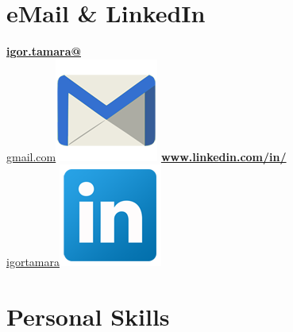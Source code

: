 \begin{aside}
    \section{eMail \& LinkedIn}
    \href{mailto:igor.tamara@gmail.com}{\small{\textbf{igor.tamara@}\\gmail.com}\includegraphics[scale=0.07]{img/email2.png}}
    \href{http:\\https://www.linkedin.com/in/igortamara/}{\textbf{www.linkedin.com/in/}\small{\\igortamara}\includegraphics[scale=0.07]{img/Linkedin.png}}
  ~
   ~
   ~
   ~
   ~
   ~
  \section{Personal Skills}
\end{aside}
